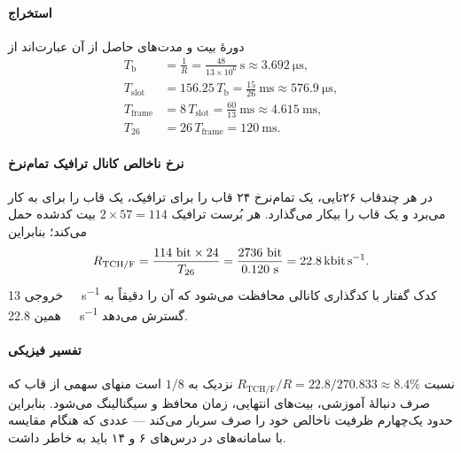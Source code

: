 \documentclass[11pt,a4paper]{article}
\begin{document}
\paragraph{استخراج} دورهٔ بیت و مدت‌های حاصل از آن عبارت‌اند از
\begin{align}
  T_{\mathrm{b}} &= \frac{1}{R} = \frac{48}{13\times10^{6}}\ \mathrm{s}
     \approx \qty{3.692}{\micro\second}, \label{eq:tb}\\
  T_{\mathrm{slot}} &= 156.25\,T_{\mathrm{b}} = \frac{15}{26}\ \mathrm{ms}
     \approx \qty{576.9}{\micro\second}, \label{eq:tslot}\\
  T_{\mathrm{frame}} &= 8\,T_{\mathrm{slot}} = \frac{60}{13}\ \mathrm{ms}
     \approx \qty{4.615}{\milli\second}, \label{eq:tframe}\\
  T_{26} &= 26\,T_{\mathrm{frame}} = \qty{120}{\milli\second}. \label{eq:t26}
\end{align}
\paragraph{نرخ ناخالص کانال ترافیک تمام‌نرخ} در هر چندقاب ۲۶تایی، یک  تمام‌نرخ ۲۴
قاب را برای ترافیک، یک قاب را برای  به کار می‌برد و یک قاب را بیکار می‌گذارد.
هر بُرست ترافیک $2\times 57 = 114$ بیت کدشده حمل می‌کند؛ بنابراین
\begin{equation}\label{eq:tchrate}
  R_{\mathrm{TCH/F}} = \frac{114\ \mathrm{bit}\times 24}{T_{26}}
  = \frac{2736\ \mathrm{bit}}{0.120\ \mathrm{s}} = \qty{22.8}{\kilo\bit\per\second}.
\end{equation}
خروجی \qty{13}{\kilo\bit\per\second} کدک گفتار با کدگذاری کانالی محافظت می‌شود که آن را
دقیقاً به همین \qty{22.8}{\kilo\bit\per\second} گسترش می‌دهد.

\paragraph{تفسیر فیزیکی} نسبت $R_{\mathrm{TCH/F}}/R = 22.8/270.833 \approx 8.4\%$ نزدیک به
$1/8$ است منهای سهمی از قاب که صرف دنبالهٔ آموزشی، بیت‌های انتهایی، زمان محافظ و سیگنالینگ
می‌شود. بنابراین  حدود یک‌چهارم ظرفیت ناخالص خود را صرف سربار می‌کند --- عددی
که هنگام مقایسه با سامانه‌های  در درس‌های ۶ و ۱۴ باید به خاطر داشت.
\end{document}
